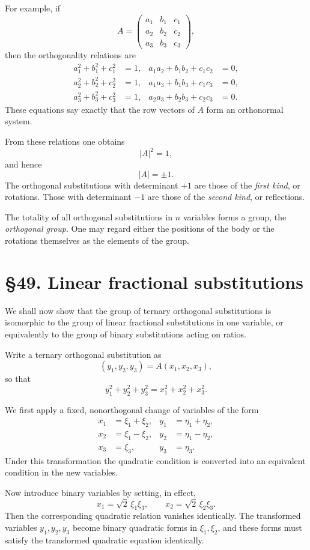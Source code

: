 \documentclass[11pt,a4paper]{book}
\newcommand{\webersection}[2]{\clearpage\section*{\S #1. #2}}
\begin{document}
For example, if
\[
A=
\begin{pmatrix}
a_1&b_1&c_1\\
a_2&b_2&c_2\\
a_3&b_3&c_3
\end{pmatrix},
\]
then the orthogonality relations are
\begin{align}
a_1^2+b_1^2+c_1^2&=1,&
a_1a_2+b_1b_2+c_1c_2&=0,\\
a_2^2+b_2^2+c_2^2&=1,&
a_1a_3+b_1b_3+c_1c_3&=0,\\
a_3^2+b_3^2+c_3^2&=1,&
a_2a_3+b_2b_3+c_2c_3&=0.
\end{align}
These equations say exactly that the row vectors of \(A\) form an orthonormal system.

From these relations one obtains
\[
|A|^2=1,
\]
and hence
\[
|A|=\pm1.
\]
The orthogonal substitutions with determinant \(+1\) are those of the \emph{first kind}, or rotations.  Those with determinant \(-1\) are those of the \emph{second kind}, or reflections.

The totality of all orthogonal substitutions in \(n\) variables forms a group, the \emph{orthogonal group}.  One may regard either the positions of the body or the rotations themselves as the elements of the group.

\webersection{49}{Linear fractional substitutions}

We shall now show that the group of ternary orthogonal substitutions is isomorphic to the group of linear fractional substitutions in one variable, or equivalently to the group of binary substitutions acting on ratios.

Write a ternary orthogonal substitution as
\begin{equation}
(y_1,y_2,y_3)=A(x_1,x_2,x_3),
\end{equation}
so that
\begin{equation}
y_1^2+y_2^2+y_3^2=x_1^2+x_2^2+x_3^2.
\end{equation}

We first apply a fixed, nonorthogonal change of variables of the form
\begin{align}
x_1&=\xi_1+\xi_2,&
y_1&=\eta_1+\eta_2,\\
x_2&=\xi_1-\xi_2,&
y_2&=\eta_1-\eta_2,\\
x_3&=\xi_3,&
y_3&=\eta_3.
\end{align}
Under this transformation the quadratic condition is converted into an equivalent condition in the new variables.

Now introduce binary variables by setting, in effect,
\[
x_1=\sqrt2\,\xi_1\xi_3,\qquad
x_2=\sqrt2\,\xi_2\xi_3.
\]
Then the corresponding quadratic relation vanishes identically.  The transformed variables \(y_1,y_2,y_3\) become binary quadratic forms in \(\xi_1,\xi_2\), and these forms must satisfy the transformed quadratic equation identically.
\end{document}
